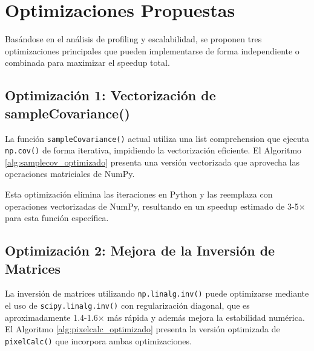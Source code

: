 \section{Optimizaciones Propuestas}

Basándose en el análisis de profiling y escalabilidad, se proponen tres optimizaciones principales que pueden implementarse de forma independiente o combinada para maximizar el speedup total.

\subsection{Optimización 1: Vectorización de sampleCovariance()}

La función \texttt{sampleCovariance()} actual utiliza una list comprehension que ejecuta \texttt{np.cov()} de forma iterativa, impidiendo la vectorización eficiente. El Algoritmo \ref{alg:samplecov_optimizado} presenta una versión vectorizada que aprovecha las operaciones matriciales de NumPy.

\begin{algorithm}[H]
\caption{sampleCovariance: Versión Optimizada Vectorizada}
\label{alg:samplecov_optimizado}
\end{algorithm}

Esta optimización elimina las iteraciones en Python y las reemplaza con operaciones vectorizadas de NumPy, resultando en un speedup estimado de 3-5× para esta función específica.

\subsection{Optimización 2: Mejora de la Inversión de Matrices}

La inversión de matrices utilizando \texttt{np.linalg.inv()} puede optimizarse mediante el uso de \texttt{scipy.linalg.inv()} con regularización diagonal, que es aproximadamente 1.4-1.6× más rápida y además mejora la estabilidad numérica. El Algoritmo \ref{alg:pixelcalc_optimizado} presenta la versión optimizada de \texttt{pixelCalc()} que incorpora ambas optimizaciones.


